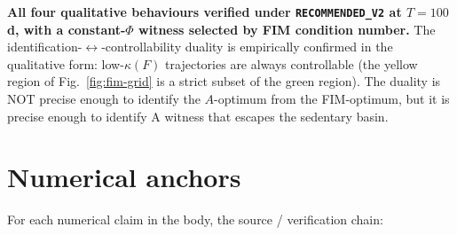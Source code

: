 \documentclass[11pt,a4paper]{article}
\theoremstyle{definition}
\begin{document}
\textbf{All four qualitative behaviours verified under \texttt{RECOMMENDED\_V2} at $T = 100$\,d, with a constant-$\Phi$ witness selected by FIM condition number.} The identification-$\leftrightarrow$-controllability duality is empirically confirmed in the qualitative form: low-$\kappa(F)$ trajectories are always controllable (the yellow region of Fig.~\ref{fig:fim-grid} is a strict subset of the green region). The duality is NOT precise enough to identify the $A$-optimum from the FIM-optimum, but it is precise enough to identify A witness that escapes the sedentary basin.

\appendix

\section{Numerical anchors} \label{app:numerical-anchors}

For each numerical claim in the body, the source / verification chain:
\end{document}
